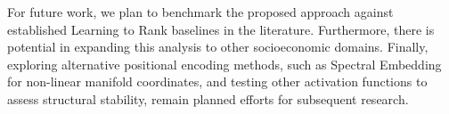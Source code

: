 \documentclass[english]{sbrt}
\begin{document}
For future work, we plan to benchmark the proposed approach against established Learning to Rank baselines in the literature. Furthermore, there is potential in expanding this analysis to other socioeconomic domains. Finally, exploring alternative positional encoding methods, such as Spectral Embedding for non-linear manifold coordinates, and testing other activation functions to assess structural stability, remain planned efforts for subsequent research.


% 
% 
\end{document}
